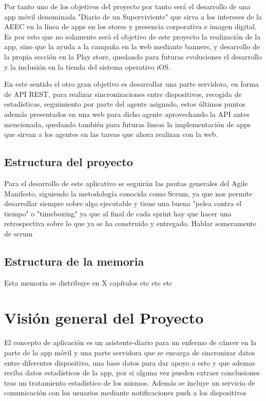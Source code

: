 \documentclass[b5paper,10pt,twoside]{book}
\begin{document}
	Por tanto uno de los objetivos del proyecto por tanto será el desarrollo de una app móvil denominada "Diario de un Superviviente" que sirva a los intereses de la AEEC en la línea de apps en los stores y presencia corporativa e imagen digital. Es por esto que no solamente será el objetivo de este proyecto la realización de la app, sino que la ayuda a la campaña en la web mediante banners, y desarrollo de la propia sección en la Play store, quedando para futuras evoluciones el desarrollo y la inclusión en la tienda del sistema operativo iOS.
	
	En este sentido el otro gran objetivo es desarrollar una parte servidora, en forma de API REST, para realizar sincronizaciones entre dispositivos, recogida de estadísticas, seguimiento por parte del agente asignado, estos últimos puntos además presentados en una web para dicho agente aprovechando la API antes mencionada, quedando también para futuras lineas la implementación de apps que sirvan a los agentes en las tareas que ahora realizan con la web.
	
	\section{Estructura del proyecto}
	
	Para el desarrollo de este aplicativo se seguirán las pautas generales del Agile Manifesto, siguiendo la metodología conocida como Scrum, ya que nos permite desarrollar siempre sobre algo ejecutable y tiene una buena "pelea contra el tiempo" o "timeboxing" ya que al final de cada sprint hay que hacer una retrospectiva sobre lo que ya se ha construido y entregado. Hablar someramente de scrum
	
	\section{Estructura de la memoria}
	
	Esta memoria se distribuye en X capítulos etc etc etc 
	
	\chapter{Visión general del Proyecto}
	El concepto de aplicación es un asistente-diario para un enfermo de cáncer en la parte de la app móvil y una parte servidora que se encarga de sincronizar datos entre diferentes dispositivo, una base datos para dar apoyo a esto y que ademas reciba datos estadísticos de la app, por si alguna vez pueden extraer conclusiones tras un tratamiento estadístico de los mismos. Además se incluye un servicio de comunicación con los usuarios mediante notificaciones push a los dispositivos
	
\end{document}
